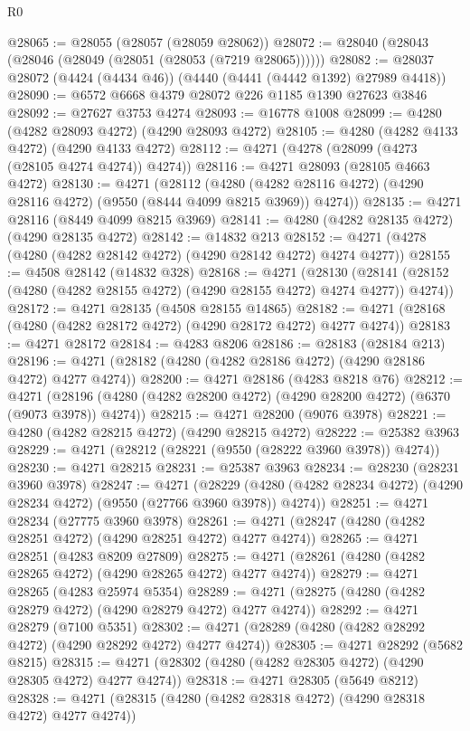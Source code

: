 \begin{lexlean}{R0}
\begin{coremodule}
@28065 := @28055 (@28057 (@28059 @28062))
@28072 := @28040 (@28043 (@28046 (@28049 (@28051 (@28053 (@7219 @28065))))))
@28082 := @28037 @28072 (@4424 (@4434 @46)) (@4440 (@4441 (@4442 @1392) @27989 @4418))
@28090 := @6572 @6668 @4379 @28072 @226 @1185 @1390 @27623 @3846
@28092 := @27627 @3753 @4274
@28093 := @16778 @1008
@28099 := @4280 (@4282 @28093 @4272) (@4290 @28093 @4272)
@28105 := @4280 (@4282 @4133 @4272) (@4290 @4133 @4272)
@28112 := @4271 (@4278 (@28099 (@4273 (@28105 @4274 @4274)) @4274))
@28116 := @4271 @28093 (@28105 @4663 @4272)
@28130 := @4271
    (@28112
      (@4280 (@4282 @28116 @4272) (@4290 @28116 @4272) (@9550 (@8444 @4099 @8215 @3969)) @4274))
@28135 := @4271 @28116 (@8449 @4099 @8215 @3969)
@28141 := @4280 (@4282 @28135 @4272) (@4290 @28135 @4272)
@28142 := @14832 @213
@28152 := @4271 (@4278 (@4280 (@4282 @28142 @4272) (@4290 @28142 @4272) @4274 @4277))
@28155 := @4508 @28142 (@14832 @328)
@28168 := @4271
    (@28130 (@28141 (@28152 (@4280 (@4282 @28155 @4272) (@4290 @28155 @4272) @4274 @4277)) @4274))
@28172 := @4271 @28135 (@4508 @28155 @14865)
@28182 := @4271 (@28168 (@4280 (@4282 @28172 @4272) (@4290 @28172 @4272) @4277 @4274))
@28183 := @4271 @28172
@28184 := @4283 @8206
@28186 := @28183 (@28184 @213)
@28196 := @4271 (@28182 (@4280 (@4282 @28186 @4272) (@4290 @28186 @4272) @4277 @4274))
@28200 := @4271 @28186 (@4283 @8218 @76)
@28212 := @4271
    (@28196 (@4280 (@4282 @28200 @4272) (@4290 @28200 @4272) (@6370 (@9073 @3978)) @4274))
@28215 := @4271 @28200 (@9076 @3978)
@28221 := @4280 (@4282 @28215 @4272) (@4290 @28215 @4272)
@28222 := @25382 @3963
@28229 := @4271 (@28212 (@28221 (@9550 (@28222 @3960 @3978)) @4274))
@28230 := @4271 @28215
@28231 := @25387 @3963
@28234 := @28230 (@28231 @3960 @3978)
@28247 := @4271
    (@28229 (@4280 (@4282 @28234 @4272) (@4290 @28234 @4272) (@9550 (@27766 @3960 @3978)) @4274))
@28251 := @4271 @28234 (@27775 @3960 @3978)
@28261 := @4271 (@28247 (@4280 (@4282 @28251 @4272) (@4290 @28251 @4272) @4277 @4274))
@28265 := @4271 @28251 (@4283 @8209 @27809)
@28275 := @4271 (@28261 (@4280 (@4282 @28265 @4272) (@4290 @28265 @4272) @4277 @4274))
@28279 := @4271 @28265 (@4283 @25974 @5354)
@28289 := @4271 (@28275 (@4280 (@4282 @28279 @4272) (@4290 @28279 @4272) @4277 @4274))
@28292 := @4271 @28279 (@7100 @5351)
@28302 := @4271 (@28289 (@4280 (@4282 @28292 @4272) (@4290 @28292 @4272) @4277 @4274))
@28305 := @4271 @28292 (@5682 @8215)
@28315 := @4271 (@28302 (@4280 (@4282 @28305 @4272) (@4290 @28305 @4272) @4277 @4274))
@28318 := @4271 @28305 (@5649 @8212)
@28328 := @4271 (@28315 (@4280 (@4282 @28318 @4272) (@4290 @28318 @4272) @4277 @4274))

\end{coremodule}
\end{lexlean}
